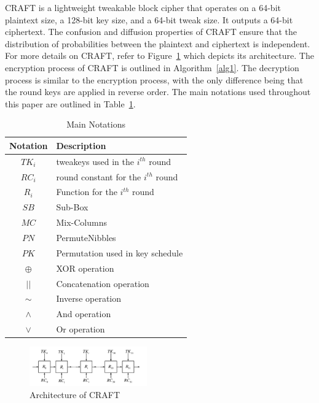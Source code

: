 \documentclass[final,5p,times,twocolumn]{elsarticle}
\begin{document}
CRAFT is a lightweight tweakable block cipher that operates on a 64-bit plaintext size, a 128-bit key size, and a 64-bit tweak size.
It outputs a 64-bit ciphertext.
The confusion and diffusion properties of CRAFT ensure that the distribution of probabilities between the plaintext and ciphertext is independent.
For more details on CRAFT, refer to Figure~\ref{fig1} which depicts its architecture.
The encryption process of CRAFT is outlined in Algorithm~\ref{alg1}.
The decryption process is similar to the encryption process, with the only difference being that the round keys are applied in reverse order.
The main notations used throughout this paper are outlined in Table~\ref{tab1}.


\begin{table}[h]
    \centering
    \caption{Main Notations}\label{tab1}%
    \begin{tabular}{|c|l|}
        \hline
        Notation & Description                           \\
        \hline
        $TK_i$   & tweakeys used in the $i^{th}$ round   \\
        $RC_i$   & round constant for the $i^{th}$ round \\
        $R_i$    & Function for the $i^{th}$ round       \\
        $SB$     & Sub-Box                               \\
        $MC$     & Mix-Columns                           \\
        $PN$     & PermuteNibbles                        \\
        $PK$     & Permutation used in key schedule      \\
        $\oplus$ & XOR operation                         \\
        $||$     & Concatenation operation               \\
        $\sim$   & Inverse operation                     \\
        $\land$  & And operation                         \\
        $\lor$   & Or operation                          \\
        \hline
    \end{tabular}
\end{table}

\begin{figure}[h]%
    \centering
    \includegraphics[width=0.45\textwidth]{./fig/struct-craft.pdf}
    \caption{Architecture of CRAFT}\label{fig1}
\end{figure}
\end{document}
